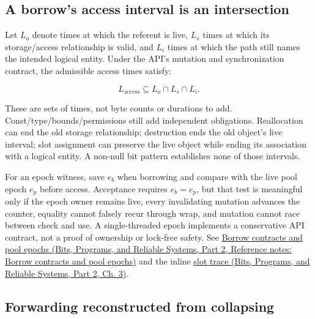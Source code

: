 \subsection{A borrow's access interval is an intersection}\label{03-visual-computing-i-ch018-a-borrows-access-interval-is-an-intersection}

\hypertarget{03-visual-computing-i-ch018-a-borrows-access-interval-is-an-intersection}{}

Let \(L_o\) denote times at which the referent is live, \(L_s\) times at which its storage/access relationship is valid, and \(L_i\) times at which the path still names the intended logical entity. Under the API's mutation and synchronization contract, the admissible access times satisfy:

\[
L_{\mathrm{access}}\subseteq L_o\cap L_s\cap L_i.
\]

These are sets of times, not byte counts or durations to add. Const/type/bounds/permissions still add independent obligations. Reallocation can end the old storage relationship; destruction ends the old object's live interval; slot assignment can preserve the live object while ending its association with a logical entity. A non-null bit pattern establishes none of those intervals.

For an epoch witness, save \(e_b\) when borrowing and compare with the live pool epoch \(e_p\) before access. Acceptance requires \(e_b=e_p\), but that test is meaningful only if the epoch owner remains live, every invalidating mutation advances the counter, equality cannot falsely recur through wrap, and mutation cannot race between check and use. A single-threaded epoch implements a conservative API contract, not a proof of ownership or lock-free safety. See \href{../01-Bits-Programs-and-Reliable-Systems-P02/main.pdf\#nameddest=appendix-aa405b7c3903}{Borrow contracts and pool epochs (Bits, Programs, and Reliable Systems, Part 2, Reference notes: Borrow contracts and pool epochs)} and the inline \href{../01-Bits-Programs-and-Reliable-Systems-P02/main.pdf\#nameddest=01-foundations-i-ch003-when-a-valid-borrow-stops-naming-the-intended-thing}{slot trace (Bits, Programs, and Reliable Systems, Part 2, Ch. 3)}.

\subsection{Forwarding reconstructed from collapsing}\label{03-visual-computing-i-ch018-forwarding-reconstructed-from-collapsing}

